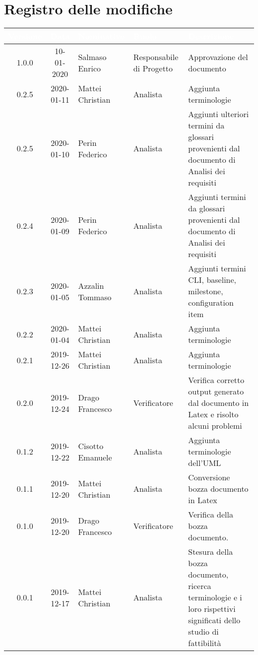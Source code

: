 \section*{Registro delle modifiche}
{
\renewcommand{\arraystretch}{1.5}
\centering
\begin{longtable}{ c c  C{4cm}  C{3cm} C{4cm}}
\textcolor{white}{\textbf{Versione}} & \textcolor{white}{\textbf{Data}} & \textcolor{white}{\textbf{Nominativo}} & \textcolor{white}{\textbf{Ruolo}} & \textcolor{white}{\textbf{Descrizione}}\\	
\endhead


1.0.0 & 10-01-2020 & Salmaso Enrico & Responsabile di Progetto & Approvazione del documento \\

0.2.5 & 2020-01-11 & Mattei Christian & Analista & Aggiunta terminologie \\

0.2.5 & 2020-01-10 & Perin Federico & Analista & Aggiunti ulteriori termini da glossari provenienti dal documento di Analisi dei requisiti \\

0.2.4 & 2020-01-09 & Perin Federico & Analista & Aggiunti termini da glossari provenienti dal documento di Analisi dei requisiti \\

0.2.3 & 2020-01-05 & Azzalin Tommaso & Analista & Aggiunti termini CLI, baseline, milestone, configuration item \\

0.2.2 & 2020-01-04 & Mattei Christian & Analista & Aggiunta terminologie \\

0.2.1 & 2019-12-26 & Mattei Christian & Analista & Aggiunta terminologie \\

0.2.0 & 2019-12-24 & Drago Francesco & Verificatore & Verifica corretto output generato dal documento in Latex e risolto alcuni problemi\\

0.1.2 & 2019-12-22 & Cisotto Emanuele & Analista & Aggiunta terminologie dell'UML \\

0.1.1 & 2019-12-20 & Mattei Christian & Analista & Conversione bozza documento in Latex\\
		
0.1.0 & 2019-12-20 & Drago Francesco & Verificatore & Verifica della bozza documento.  \\
		
0.0.1 & 2019-12-17 & Mattei Christian & Analista & Stesura della bozza documento, ricerca terminologie e i loro rispettivi significati dello studio di fattibilità \\
		
\end{longtable}
}